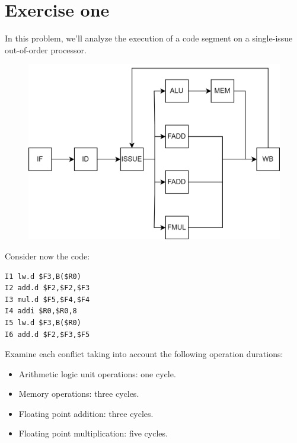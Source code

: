 \section{Exercise one}

In this problem, we'll analyze the execution of a code segment on a single-issue out-of-order processor.
\begin{figure}[H]
    \centering
    \includegraphics[width=0.75\linewidth]{images/complex.png}
\end{figure} 
Consider now the code:
\begin{verbatim}
I1 lw.d $F3,B($R0)
I2 add.d $F2,$F2,$F3
I3 mul.d $F5,$F4,$F4
I4 addi $R0,$R0,8
I5 lw.d $F3,B($R0)
I6 add.d $F2,$F3,$F5
\end{verbatim}
Examine each conflict taking into account the following operation durations:
\begin{itemize}
    \item Arithmetic logic unit operations: one cycle.
    \item Memory operations: three cycles.
    \item Floating point addition: three cycles.
    \item Floating point multiplication: five cycles.
\end{itemize}

